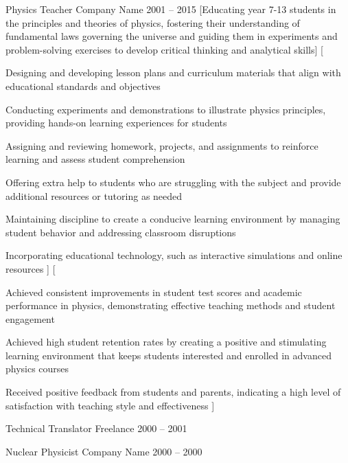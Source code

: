 \documentclass[a4paper]{CV_responsibilities_achievements}
\begin{document}
\Career
    {Physics Teacher} %
    {Company Name} %
    {2001 -- 2015} %
    [Educating year 7-13 students in the principles and theories of physics, fostering their understanding of fundamental laws governing the universe and guiding them in experiments and problem-solving exercises to develop critical thinking and analytical skills] %
    [
        \item Designing and developing lesson plans and curriculum materials that align with educational standards and objectives 
        \item Conducting experiments and demonstrations to illustrate physics principles, providing hands-on learning experiences for students
        \item  Assigning and reviewing homework, projects, and assignments to reinforce learning and assess student comprehension
        \item Offering extra help to students who are struggling with the subject and provide additional resources or tutoring as needed
        \item Maintaining discipline to create a conducive learning environment by managing student behavior and addressing classroom disruptions
        \item  Incorporating educational technology, such as interactive simulations and online resources
    ]
    [
        \item Achieved consistent improvements in student test scores and academic performance in physics, demonstrating effective teaching methods and student engagement
        \item Achieved high student retention rates by creating a positive and stimulating learning environment that keeps students interested and enrolled in advanced physics courses
        \item Received positive feedback from students and parents, indicating a high level of satisfaction with teaching style and effectiveness
    ]
 
\Career
    {Technical Translator} %
    {Freelance} %
    {2000 -- 2001} %

\Career
    {Nuclear Physicist} %
    {Company Name} %
    {2000 -- 2000} %


\end{document}
